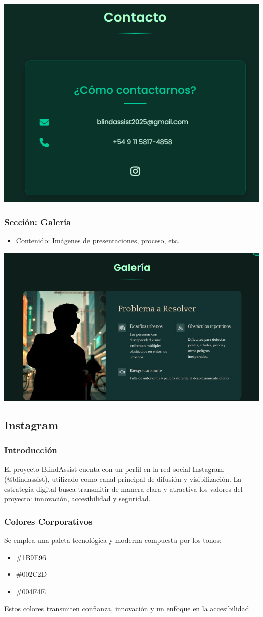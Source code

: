 \documentclass[12pt,a4paper]{article}
\begin{document}
    \includegraphics[width=0.5\linewidth]{Carpeta tecnica/cntacto.png}


\subsubsection*{Sección: Galería}
\begin{itemize}
    \item Contenido: Imágenes de presentaciones, proceso, etc.
\end{itemize}


    \includegraphics[width=0.5\linewidth]{Carpeta tecnica/galeria.png}


\subsection{Instagram}

\subsubsection{Introducción}
El proyecto BlindAssist cuenta con un perfil en la red social Instagram (@blindassist), utilizado como canal principal de difusión y visibilización. La estrategia digital busca transmitir de manera clara y atractiva los valores del proyecto: innovación, accesibilidad y seguridad.


\subsubsection{Colores Corporativos}
Se emplea una paleta tecnológica y moderna compuesta por los tonos:
\begin{itemize}
    \item \textcolor{verdeagua}{\#1B9E96}
    \item \textcolor{verdeoscuro}{\#002C2D}
    \item \textcolor{verdemedio}{\#004F4E}
\end{itemize}
Estos colores transmiten confianza, innovación y un enfoque en la accesibilidad.
\end{document}

